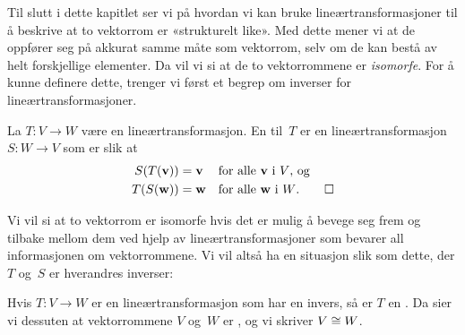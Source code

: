 Til slutt i dette kapitlet ser vi på hvordan vi kan bruke
lineærtransformasjoner til å beskrive at to vektorrom er «strukturelt
like».  Med dette mener vi at de oppfører seg på akkurat samme måte
som vektorrom, selv om de kan bestå av helt forskjellige elementer.
Da vil vi si at de to vektorrommene er \emph{isomorfe}.  For å kunne
definere dette, trenger vi først et begrep om inverser for
lineærtransformasjoner.

\begin{defn}
La $T \colon V \to W$ være en lineærtransformasjon.  En
 til~$T$ er en lineærtransformasjon $S \colon W \to V$
som er slik at
\begin{align*}
S(T(\mathbf{v})) &= \mathbf{v} &&\text{for alle $\mathbf{v}$ i~$V$, og} \\
T(S(\mathbf{w})) &= \mathbf{w} &&\text{for alle $\mathbf{w}$ i~$W$.}
\qedhere
\end{align*}
\end{defn}

Vi vil si at to vektorrom er isomorfe hvis det er mulig å bevege seg
frem og tilbake mellom dem ved hjelp av lineærtransformasjoner som
bevarer all informasjonen om vektorrommene.  Vi vil altså ha en
situasjon slik som dette, der $T$ og~$S$ er hverandres inverser:
\begin{center}
\end{center}
\begin{defn}
Hvis $T \colon V \to W$ er en lineærtransformasjon som har en invers,
så er $T$ en .  Da sier vi dessuten at vektorrommene
$V$ og~$W$ er , og vi skriver $V \cong W$.
\end{defn}





\kapittelslutt
